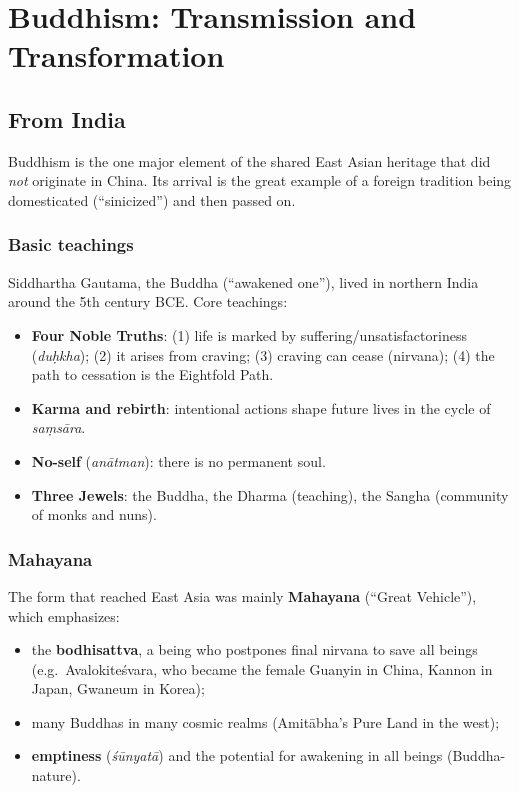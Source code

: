 \chapter{Buddhism: Transmission and Transformation}

\section{From India}

Buddhism is the one major element of the shared East Asian heritage that did \emph{not}
originate in China. Its arrival is the great example of a foreign tradition being
domesticated (``sinicized'') and then passed on.

\subsection{Basic teachings}

Siddhartha Gautama, the Buddha (``awakened one''), lived in northern India around the 5th
century BCE. Core teachings:

\begin{itemize}
  \item \textbf{Four Noble Truths}: (1) life is marked by suffering/unsatisfactoriness
        (\emph{duḥkha}); (2) it arises from craving; (3) craving can cease (nirvana);
        (4) the path to cessation is the Eightfold Path.
  \item \textbf{Karma and rebirth}: intentional actions shape future lives in the cycle of
        \emph{saṃsāra}.
  \item \textbf{No-self} (\emph{anātman}): there is no permanent soul.
  \item \textbf{Three Jewels}: the Buddha, the Dharma (teaching), the Sangha (community of
        monks and nuns).
\end{itemize}

\subsection{Mahayana}

The form that reached East Asia was mainly \textbf{Mahayana} (``Great Vehicle''), which
emphasizes:

\begin{itemize}
  \item the \textbf{bodhisattva}, a being who postpones final nirvana to save all beings
        (e.g.\ Avalokiteśvara, who became the female Guanyin  in China,
        Kannon  in Japan, Gwaneum  in Korea);
  \item many Buddhas in many cosmic realms (Amitābha's Pure Land in the west);
  \item \textbf{emptiness} (\emph{śūnyatā}) and the potential for awakening in all beings
        (Buddha-nature).
\end{itemize}

